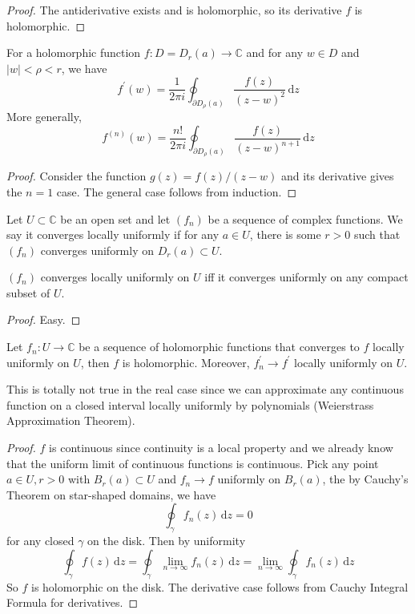 \begin{proof}
    The antiderivative exists and is holomorphic, so its derivative $f$ is holomorphic.
\end{proof}
\begin{theorem}
    For a holomorphic function $f:D=D_r(a)\to\mathbb C$ and for any $w\in D$ and $|w|<\rho<r$, we have
    $$f^\prime(w)=\frac{1}{2\pi i}\oint_{\partial D_\rho(a)}\frac{f(z)}{(z-w)^2}\,\mathrm dz$$
    More generally,
    $$f^{(n)}(w)=\frac{n!}{2\pi i}\oint_{\partial D_\rho(a)}\frac{f(z)}{(z-w)^{n+1}}\,\mathrm dz$$
\end{theorem}
\begin{proof}
    Consider the function $g(z)=f(z)/(z-w)$ and its derivative gives the $n=1$ case.
    The general case follows from induction.
\end{proof}
\begin{definition}
    Let $U\subset\mathbb C$ be an open set and let $(f_n)$ be a sequence of complex functions.
    We say it converges locally uniformly if for any $a\in U$, there is some $r>0$ such that $(f_n)$ converges uniformly on $D_r(a)\subset U$.
\end{definition}
\begin{proposition}
    $(f_n)$ converges locally uniformly on $U$ iff it converges uniformly on any compact subset of $U$.
\end{proposition}
\begin{proof}
    Easy.
\end{proof}
\begin{theorem}
    Let $f_n:U\to\mathbb C$ be a sequence of holomorphic functions that converges to $f$ locally uniformly on $U$, then $f$ is holomorphic.
    Moreover, $f_n^\prime\to f^\prime$ locally uniformly on $U$.
\end{theorem}
\begin{remark}
    This is totally not true in the real case since we can approximate any continuous function on a closed interval locally uniformly by polynomials (Weierstrass Approximation Theorem).
\end{remark}
\begin{proof}
    $f$ is continuous since continuity is a local property and we already know that the uniform limit of continuous functions is continuous.
    Pick any point $a\in U,r>0$ with $B_r(a)\subset U$ and $f_n\to f$ uniformly on $B_r(a)$, the by Cauchy's Theorem on star-shaped domains, we have
    $$\oint_\gamma f_n(z)\,\mathrm dz=0$$
    for any closed $\gamma$ on the disk.
    Then by uniformity
    $$\oint_\gamma f(z)\,\mathrm dz=\oint_\gamma\lim_{n\to\infty}f_n(z)\,\mathrm dz=\lim_{n\to\infty}\oint_\gamma f_n(z)\,\mathrm dz$$
    So $f$ is holomorphic on the disk.
    The derivative case follows from Cauchy Integral Formula for derivatives.
\end{proof}
